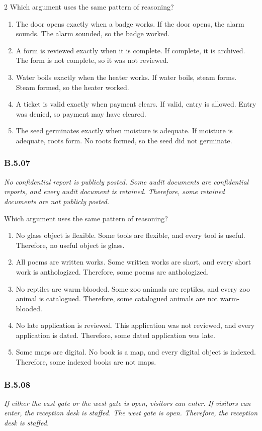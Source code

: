 \documentclass[10pt]{extarticle}
\newcommand{\choice}[1]{\item #1}
\newcommand{\bankitem}[1]{\subsubsection*{#1}}
\begin{document}
\begin{multicols}{2}
Which argument uses the same pattern of reasoning?
\begin{enumerate}[label=(\alph*)]
  \choice{The door opens exactly when a badge works. If the door opens, the alarm sounds. The alarm sounded, so the badge worked.}
  \choice{A form is reviewed exactly when it is complete. If complete, it is archived. The form is not complete, so it was not reviewed.}
  \choice{Water boils exactly when the heater works. If water boils, steam forms. Steam formed, so the heater worked.}
  \choice{A ticket is valid exactly when payment clears. If valid, entry is allowed. Entry was denied, so payment may have cleared.}
  \choice{The seed germinates exactly when moisture is adequate. If moisture is adequate, roots form. No roots formed, so the seed did not germinate.}
\end{enumerate}
\bankitem{B.5.07}
\emph{No confidential report is publicly posted. Some audit documents are confidential reports, and every audit document is retained. Therefore, some retained documents are not publicly posted.}

Which argument uses the same pattern of reasoning?
\begin{enumerate}[label=(\alph*)]
  \choice{No glass object is flexible. Some tools are flexible, and every tool is useful. Therefore, no useful object is glass.}
  \choice{All poems are written works. Some written works are short, and every short work is anthologized. Therefore, some poems are anthologized.}
  \choice{No reptiles are warm-blooded. Some zoo animals are reptiles, and every zoo animal is catalogued. Therefore, some catalogued animals are not warm-blooded.}
  \choice{No late application is reviewed. This application was not reviewed, and every application is dated. Therefore, some dated application was late.}
  \choice{Some maps are digital. No book is a map, and every digital object is indexed. Therefore, some indexed books are not maps.}
\end{enumerate}
\bankitem{B.5.08}
\emph{If either the east gate or the west gate is open, visitors can enter. If visitors can enter, the reception desk is staffed. The west gate is open. Therefore, the reception desk is staffed.}


\end{multicols}
\end{document}

